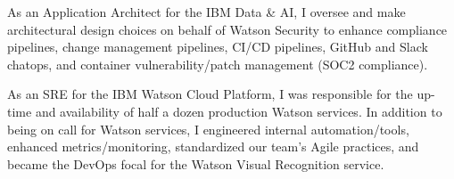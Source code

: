 \documentclass[10pt,a4paper,ragged2e,withhyper]{altacv}
\begin{document}
\begin{paracol}{2}















As an Application Architect for the IBM Data & AI, I oversee and make architectural design choices on behalf of Watson Security to enhance compliance pipelines, change management pipelines, CI/CD pipelines, GitHub and Slack chatops, and container vulnerability/patch management (SOC2 compliance).

\divider

As an SRE for the IBM Watson Cloud Platform, I was responsible for the up-time and availability of half a dozen production Watson services. In addition to being on call for Watson services, I engineered internal automation/tools, enhanced metrics/monitoring, standardized our team's Agile practices, and became the DevOps focal for the Watson Visual Recognition service.


\end{paracol}
\end{document}
